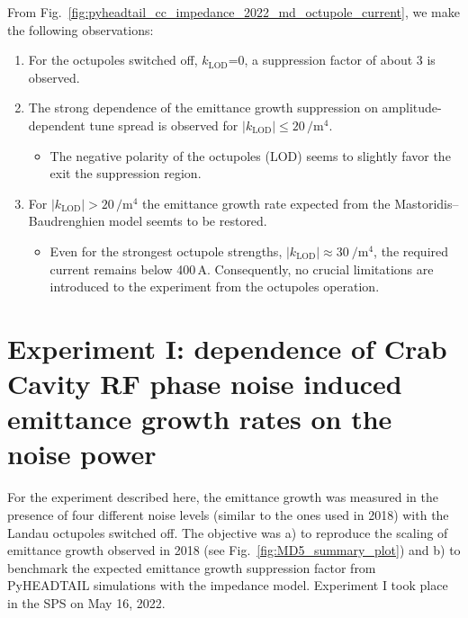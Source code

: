From Fig.~\ref{fig:pyheadtail_cc_impedance_2022_md_octupole_current}, we make the following observations:
\begin{enumerate}
   \item For the octupoles switched off, $k_\mathrm{LOD}$=0, a suppression factor of about 3 is observed.
   \item The strong dependence of the emittance growth suppression on amplitude-dependent tune spread is observed for $|k_\mathrm{LOD}| \leq 20$\,$\mathrm{/m^4}$.
      \begin{itemize}
         \item The negative polarity of the octupoles (LOD) seems to slightly favor the exit the suppression region.
      \end{itemize}
   \item For $|k_\mathrm{LOD}| > 20$\,$\mathrm{/m^4}$ the emittance growth rate expected from the Mastoridis--Baudrenghien model seemts to be restored. 
      \begin{itemize}
         \item Even for the strongest octupole strengths, $| k_\mathrm{LOD} |\approx 30 \ \mathrm{/m^4}$, the required current remains below 400\,A. Consequently, no crucial limitations are introduced to the experiment from the octupoles operation.
      \end{itemize}
\end{enumerate}


\section{Experiment I: dependence of Crab Cavity RF phase noise induced emittance growth rates on the noise power}\label{subsec:cc_md_2022_noise_scan} 

For the experiment described here, the emittance growth was measured in the presence of four different noise levels (similar to the ones used in 2018) with the Landau octupoles switched off. The objective was a) to reproduce the scaling of emittance growth observed in 2018 (see Fig.~\ref{fig:MD5_summary_plot}) and b) to benchmark the expected emittance growth suppression factor from PyHEADTAIL simulations with the impedance model. Experiment I took place in the SPS on May 16, 2022.


